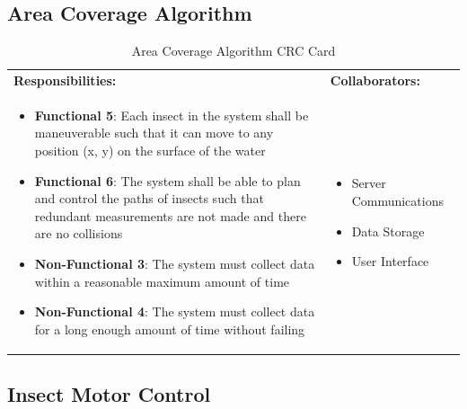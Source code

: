 \documentclass[11pt]{article}
\begin{document}
\subsection{Area Coverage Algorithm}
\begin{table}[H]
\centering
\label{my-label}
\begin{tabular}{ | >{\raggedright\arraybackslash}p{} | >{\raggedright\arraybackslash}p{} | }
\hline
\multicolumn{2}{|c|}{\textbf{Hydroswarm}}             \\ \hline
\textbf{Responsibilities:} & \textbf{Collaborators:} \\ \hline
\begin{itemize}
\item \textbf{Functional 5}: Each insect in the system shall be maneuverable such that it
can move to any position (x, y) on the surface of the water
\item \textbf{Functional 6}: The system shall be able to plan and control the paths of insects
such that redundant measurements are not made and there are no collisions
\item \textbf{Non-Functional 3}: The system must collect data within a reasonable maximum amount of
time
\item \textbf{Non-Functional 4}:  The system must collect data for a long enough amount of time
without failing
\end{itemize}
&
\begin{itemize}
\item Server Communications
\item Data Storage
\item User Interface
\end{itemize} \\ \hline
\end{tabular}
\caption{Area Coverage Algorithm CRC Card}
\end{table}

\subsection{Insect Motor Control}
\end{document}
